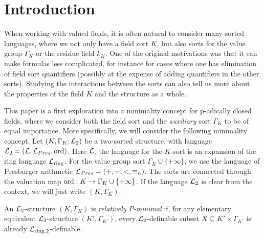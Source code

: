 \section{Introduction}
When working with valued fields, it is often natural to consider many-sorted languages, where we not only have a field sort $K$, but also sorts for the value group $\Gamma_K$ or the residue field $k_K$. One of the original motivations was that it can make formulas less complicated, for instance for cases where one has elimination of field sort quantifiers (possibly at the expense of adding quantifiers in the other sorts). Studying the interactions between the sorts can also tell us more about the properties of the field $K$ and the structure as a whole.  


This paper is a first exploration into a minimality concept for p-adically closed fields, where we consider both the field sort and the \emph{auxiliary} sort $\Gamma_K$ to be of equal importance. More specifically, we will consider the following minimality concept. Let $(K, \Gamma_K;\mathcal{L}_2)$ be a two-sorted structure, with language $\mathcal{L}_2 = (\mathcal{L}, {\mathcal L}_{Pres}, \operatorname{ord})$. Here ${\mathcal L}$, the language for the $K$-sort is an expansion of the ring language $\mathcal{L}_{\text{ring}}$. For the value group sort $\Gamma_K\cup\{+\infty\}$, we use the language of Presburger arithmetic ${\mathcal L}_{Pres} = (+,-,<,\equiv_n)$. The sorts are connected through the valuation map $\operatorname{ord}: K\to \Gamma_K\cup\{+\infty\}$. If the language $\mathcal{L}_2$ is clear from the context, we will just write $(K, \Gamma_K)$.
\begin{defn}
An $\mathcal{L}_2$-structure $(K,\Gamma_K)$ is \emph{relatively $P$-minimal} if, for any elementary equivalent $\mathcal{L}_2$-structure $(K',\Gamma_{K'})$, every $\mathcal{L}_2$-definable subset $X\subseteq K'\times \Gamma_{K'}$ is already ${\mathcal L}_{\rm ring, 2}$-definable.
\end{defn}


